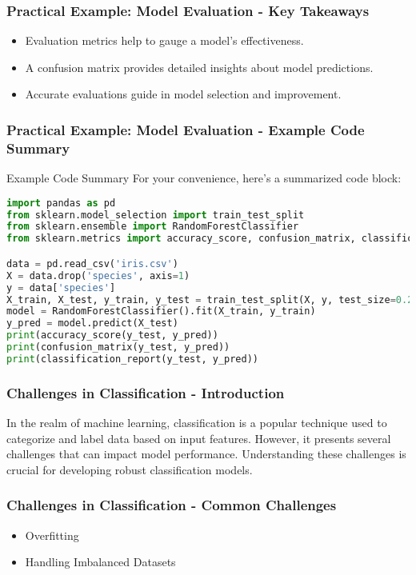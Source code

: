 \documentclass[aspectratio=169]{beamer}
\begin{document}
\begin{frame}[fragile]
    \frametitle{Practical Example: Model Evaluation - Key Takeaways}
    \begin{itemize}
        \item Evaluation metrics help to gauge a model’s effectiveness.
        \item A confusion matrix provides detailed insights about model predictions.
        \item Accurate evaluations guide in model selection and improvement.
    \end{itemize}
\end{frame}

\begin{frame}[fragile]
    \frametitle{Practical Example: Model Evaluation - Example Code Summary}
    \begin{block}{Example Code Summary}
        For your convenience, here’s a summarized code block:
        \begin{lstlisting}[language=Python]
import pandas as pd
from sklearn.model_selection import train_test_split
from sklearn.ensemble import RandomForestClassifier
from sklearn.metrics import accuracy_score, confusion_matrix, classification_report

data = pd.read_csv('iris.csv')
X = data.drop('species', axis=1)
y = data['species']
X_train, X_test, y_train, y_test = train_test_split(X, y, test_size=0.2, random_state=42)
model = RandomForestClassifier().fit(X_train, y_train)
y_pred = model.predict(X_test)
print(accuracy_score(y_test, y_pred))
print(confusion_matrix(y_test, y_pred))
print(classification_report(y_test, y_pred))
        \end{lstlisting}
    \end{block}
\end{frame}

\begin{frame}[fragile]
  \frametitle{Challenges in Classification - Introduction}
  In the realm of machine learning, classification is a popular technique used to categorize and label data based on input features. 
  However, it presents several challenges that can impact model performance. 
  Understanding these challenges is crucial for developing robust classification models.
\end{frame}

\begin{frame}[fragile]
  \frametitle{Challenges in Classification - Common Challenges}
  \begin{itemize}
    \item Overfitting
    \item Handling Imbalanced Datasets
  \end{itemize}
\end{frame}
\end{document}
